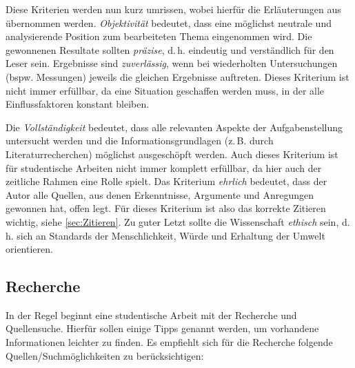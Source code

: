 Diese Kriterien werden nun kurz umrissen, wobei hierfür die Erläuterungen aus \cite{Voss} übernommen werden. \textit{Objektivität} bedeutet, dass eine möglichst neutrale und analysierende Position zum bearbeiteten Thema eingenommen wird. Die gewonnenen Resultate sollten \textit{präzise}, d.\,h. eindeutig und verständlich für den Leser sein. Ergebnisse sind \textit{zuverlässig}, wenn bei wiederholten Untersuchungen (bspw. Messungen) jeweils die gleichen Ergebnisse auftreten. Dieses Kriterium ist nicht immer erfüllbar, da eine Situation geschaffen werden muss, in der alle Einflussfaktoren konstant bleiben.

Die \textit{Vollständigkeit} bedeutet, dass alle relevanten Aspekte der Aufgabenstellung untersucht werden und die Informationsgrundlagen (z.\,B. durch Literaturrecherchen) möglichst ausgeschöpft werden. Auch dieses Kriterium ist für studentische Arbeiten nicht immer komplett erfüllbar, da hier auch der zeitliche Rahmen eine Rolle spielt. Das Kriterium \textit{ehrlich} bedeutet, dass der Autor alle Quellen, aus denen Erkenntnisse, Argumente und Anregungen gewonnen hat, offen legt. Für dieses Kriterium ist also das korrekte Zitieren wichtig, siehe \cref{sec:Zitieren}. Zu guter Letzt sollte die Wissenschaft \textit{ethisch} sein, d.\,h. sich an Standards der Menschlichkeit, Würde und Erhaltung der Umwelt orientieren.


\subsection{Recherche}
\label{sec:Recherche}

In der Regel beginnt eine studentische Arbeit mit der Recherche und Quellensuche. Hierfür sollen einige Tipps genannt werden, um vorhandene Informationen leichter zu finden. Es empfiehlt sich für die Recherche folgende Quellen/Suchmöglichkeiten zu berücksichtigen:

